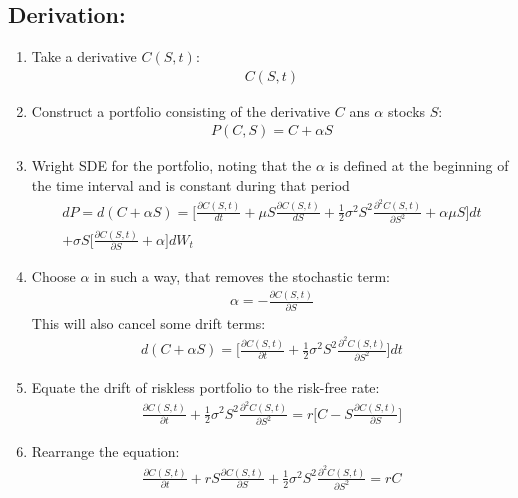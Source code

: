 \subsection{Derivation:}
\begin{enumerate}
	\item Take a derivative $C(S, t)$:
	\begin{eqnarray}
	C(S, t)
	\end{eqnarray}
	\item Construct a portfolio consisting of the derivative $C$ ans $\alpha$ stocks $S$:
	\begin{eqnarray}
	P(C, S) = C + \alpha S
	\end{eqnarray}
	\item Wright SDE for the portfolio, noting that the $\alpha$ is defined at the beginning of the time interval and is constant during that period
	\begin{eqnarray}
	\nonumber
	dP = d(C + \alpha S) = \Big[\frac{\partial C(S, t)}{dt} + \mu S \frac{\partial C(S, t)}{dS} + \frac{1}{2}\sigma^{2}S^{2}\frac{\partial ^{2}C(S, t)}{\partial S^{2}} + \alpha\mu S\Big]dt \\+ \sigma S \Big[\frac{\partial C(S, t)}{\partial S} + \alpha\Big]dW_{t}
	\end{eqnarray}
	\item Choose $\alpha$ in such a way, that removes the stochastic term:
	\begin{eqnarray}
	\alpha = -\frac{\partial C(S, t)}{\partial S}
	\end{eqnarray}
	This will also cancel some drift terms:
	\begin{eqnarray}
	d(C + \alpha S) = \Big[\frac{\partial C(S, t)}{\partial t} + \frac{1}{2}\sigma^{2}S^{2}\frac{\partial ^{2}C(S, t)}{\partial S^{2}}\Big]dt
	\end{eqnarray}
	\item Equate the drift of riskless portfolio to the risk-free rate:
	\begin{eqnarray}
	\frac{\partial C(S, t)}{\partial t} + \frac{1}{2}\sigma^{2}S^{2}\frac{\partial ^{2}C(S, t)}{\partial S^{2}} = r\Big[C - S\frac{\partial C(S, t)}{\partial S}\Big]
	\end{eqnarray}
	\item Rearrange the equation:
	\begin{eqnarray}
	\frac{\partial C(S, t)}{\partial t} + rS\frac{\partial{C(S, t)}}{\partial S} + \frac{1}{2}\sigma^{2}S^{2}\frac{\partial ^{2}C(S, t)}{\partial S^{2}} = rC
	\end{eqnarray}
\end{enumerate}

